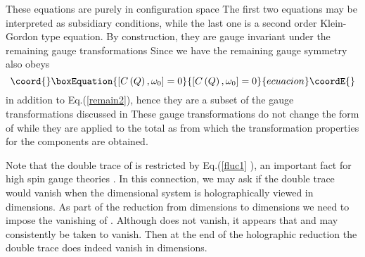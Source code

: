 \documentclass[a4paper,12pt]{article}
\begin{document}
These equations are purely in configuration space \coordHE{} The first two
equations may be interpreted as subsidiary conditions, while the last one is
a second order Klein-Gordon type equation. By construction, they are gauge
invariant under the remaining gauge transformations \coordHE{} Since we have \coordHE{}
the remaining gauge symmetry also obeys 
\begin{equation}\coord{}\boxEquation{
\left[ C\left( Q\right) ,\omega _{0}\right] =0
}{
\left[ C\left( Q\right) ,\omega _{0}\right] =0
}{ecuacion}\coordE{}\end{equation}
in addition to Eq.(\ref{remain2}), hence they are a subset of the gauge
transformations discussed in \cite{highspin} These gauge transformations do
not change the form of \coordHE{} while they are applied to the total \coordHE{} as \coordHE{} from
which the transformation properties for the components \coordHE{} are obtained.

Note that the double trace of \coordHE{} is restricted by Eq.(\ref{fluc1}%
), an important fact for high spin gauge theories \cite{fronsdal}. In this
connection, we may ask if the double trace would vanish when the \coordHE{}
dimensional system is holographically viewed in \coordHE{} dimensions. As part of
the reduction from \coordHE{} dimensions to \coordHE{} dimensions we need to impose the
vanishing of \coordHE{}. Although \coordHE{} does
not vanish, it appears that \coordHE{} and \coordHE{} may
consistently be taken to vanish. Then at the end of the holographic
reduction the double trace does indeed vanish in \coordHE{} dimensions.
\end{document}

